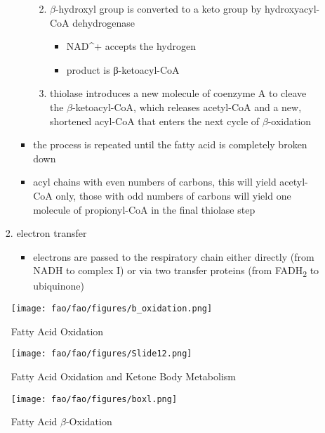 \documentclass{scrartcl}
\begin{document}
\begin{enumerate}
\begin{itemize}
\begin{enumerate}
\begin{itemize}
\begin{enumerate}
\begin{itemize}
\end{itemize}
\item \(\beta\)-hydroxyl group is converted to a keto group by
hydroxyacyl-CoA dehydrogenase
\begin{itemize}
\item NAD\^{}+ accepts the hydrogen
\item product is β-ketoacyl-CoA
\end{itemize}
\item thiolase introduces a new molecule of coenzyme A to cleave
the \(\beta\)-ketoacyl-CoA, which releases acetyl-CoA and a new,
shortened acyl-CoA that enters the next cycle of
\(\beta\)-oxidation
\end{enumerate}
\item the process is repeated until the fatty acid is completely
broken down
\item acyl chains with even numbers of carbons, this will yield
acetyl-CoA only, those with odd numbers of carbons will yield
one molecule of propionyl-CoA in the final thiolase step
\end{itemize}
\item electron transfer
\begin{itemize}
\item electrons are passed to the respiratory chain either directly
(from NADH to complex I) or via two transfer proteins (from
FADH\textsubscript{2} to ubiquinone)
\end{itemize}
\end{enumerate}
\end{itemize}

\begin{figure}[htbp]
\centering
\texttt{[image: fao/fao/figures/b\_oxidation.png]}
\caption{\label{fig:orgbb8a794}Fatty Acid Oxidation}
\end{figure}

\begin{figure}[htbp]
\centering
\texttt{[image: fao/fao/figures/Slide12.png]}
\caption{\label{fig:orge351a2f}Fatty Acid Oxidation and Ketone Body Metabolism}
\end{figure}


\begin{figure}[htbp]
\centering
\texttt{[image: fao/fao/figures/boxl.png]}
\caption{\label{fig:org5116a23}Fatty Acid \(\beta\)-Oxidation}
\end{figure}





\end{enumerate}
\end{document}
